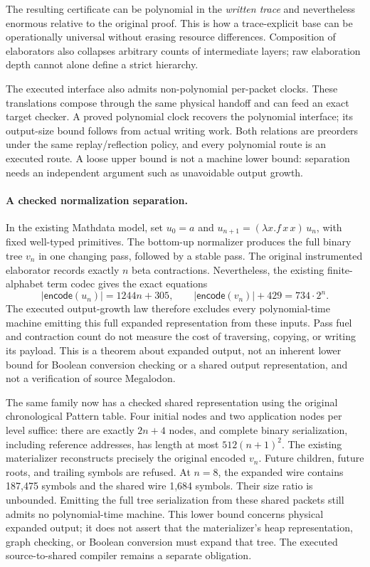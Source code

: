 \documentclass[11pt]{article}
\begin{document}
The resulting certificate can be polynomial in the \emph{written trace}
and nevertheless enormous relative to the original proof. This is how a
trace-explicit base can be operationally universal without erasing resource
differences. Composition of elaborators also collapses arbitrary counts
of intermediate layers; raw elaboration depth cannot alone define a
strict hierarchy.

The executed interface also admits non-polynomial per-packet clocks.
These translations compose through the same physical handoff and can
feed an exact target checker. A proved polynomial clock recovers the
polynomial interface; its output-size bound follows from actual writing
work. Both relations are preorders under the same replay/reflection policy,
and every polynomial route is an executed route. A loose upper bound is
not a machine lower bound: separation needs an independent argument such
as unavoidable output growth.

\paragraph{A checked normalization separation.}
In the existing Mathdata model, set $u_0=a$ and
$u_{n+1}=(\lambda x. f\,x\,x)\,u_n$, with fixed well-typed primitives.
The bottom-up normalizer produces the full binary tree $v_n$ in one
changing pass, followed by a stable pass. The original instrumented
elaborator records exactly $n$ beta contractions. Nevertheless, the
existing finite-alphabet term codec gives the exact equations
\[
 |\mathsf{encode}(u_n)|=1244n+305,\qquad
 |\mathsf{encode}(v_n)|+429=734\cdot2^n.
\]
The executed output-growth law therefore excludes every polynomial-time
machine emitting this full expanded representation from these inputs.
Pass fuel and contraction count do not measure the cost of traversing,
copying, or writing its payload. This is a theorem about expanded output,
not an inherent lower bound for Boolean conversion checking or a shared
output representation, and not a verification of source Megalodon.

The same family now has a checked shared representation using the original
chronological Pattern table. Four initial nodes and two application nodes
per level suffice: there are exactly $2n+4$ nodes, and complete binary
serialization, including reference addresses, has length at most
$512(n+1)^2$. The existing materializer reconstructs precisely the original
encoded $v_n$. Future children, future roots, and trailing symbols are
refused. At $n=8$, the expanded wire contains 187,475 symbols and the
shared wire 1,684 symbols. Their size ratio is unbounded. Emitting the
full tree serialization from these shared packets still admits no
polynomial-time machine. This lower bound concerns physical expanded
output; it does not assert that the materializer's heap representation,
graph checking, or Boolean conversion must expand that tree. The executed
source-to-shared compiler remains a separate obligation.
\end{document}
